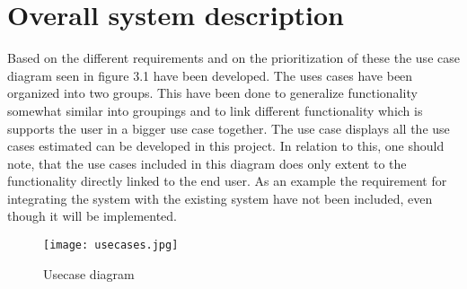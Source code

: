 \section{Overall system description}
Based on the different requirements and on the prioritization of these the use case diagram seen in figure 3.1 have been developed. The uses cases have been organized into two groups. This have been done to generalize functionality somewhat similar into groupings and to link different functionality which is supports the user in a bigger use case together. The use case displays all the use cases estimated can be developed in this project. In relation to this, one should note, that the use cases included in this diagram does only extent to the functionality directly linked to the end user. As an example the requirement for integrating the system with the existing system have not been included, even though it will be implemented.
\begin{figure}
\begin{center}
\texttt{[image: usecases.jpg]}
\end{center}
\caption{Usecase diagram}
\end{figure}


